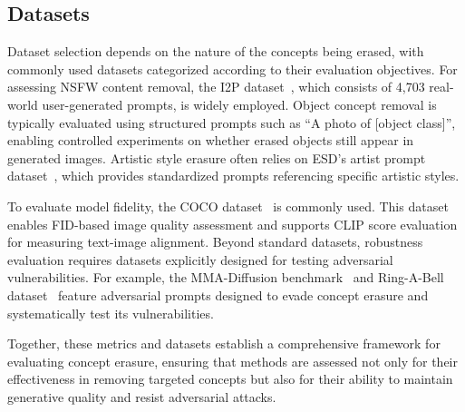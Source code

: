 \subsection{Datasets}
Dataset selection depends on the nature of the concepts being erased, with commonly used datasets categorized according to their evaluation objectives. For assessing NSFW content removal, the I2P dataset~\cite{Schramowski2022SafeLD}, which consists of 4,703 real-world user-generated prompts, is widely employed. Object concept removal is typically evaluated using structured prompts such as ``A photo of [object class]'', enabling controlled experiments on whether erased objects still appear in generated images. Artistic style erasure often relies on ESD's artist prompt dataset~\cite{esd}, which provides standardized prompts referencing specific artistic styles.

To evaluate model fidelity, the COCO dataset~\cite{lin2014microsoft} is commonly used. This dataset enables FID-based image quality assessment and supports CLIP score evaluation for measuring text-image alignment. Beyond standard datasets, robustness evaluation requires datasets explicitly designed for testing adversarial vulnerabilities. 
For example, the MMA-Diffusion benchmark~\cite{Yang2023MMADiffusionMA} and Ring-A-Bell dataset~\cite{Tsai2023RingABellHR} feature adversarial prompts designed to evade concept erasure and systematically test its vulnerabilities.


Together, these metrics and datasets establish a comprehensive framework for evaluating concept erasure, ensuring that methods are assessed not only for their effectiveness in removing targeted concepts but also for their ability to maintain generative quality and resist adversarial attacks.

